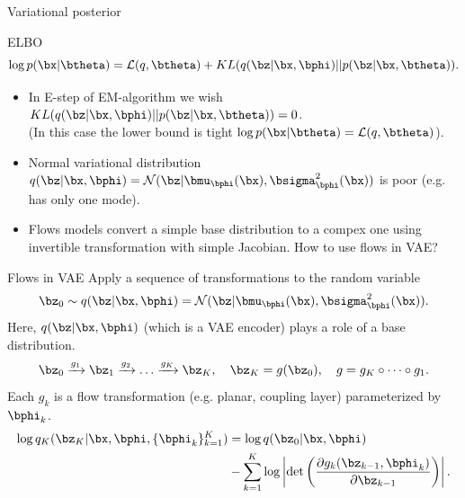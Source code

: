 \begin{frame}{Variational posterior}
	\begin{block}{ELBO}
	\[
		\log p(\bx | \btheta) = \mathcal{L}(q, \btheta) + KL(q(\bz | \bx, \bphi) || p(\bz | \bx, \btheta)).
	\]
	\end{block}
	\begin{itemize}
		\item In E-step of EM-algorithm we wish $KL(q(\bz | \bx, \bphi) || p(\bz | \bx, \btheta)) = 0$. \\
		(In this case the lower bound is tight $\log p(\bx | \btheta) = \mathcal{L}(q, \btheta)$). \\
		\item Normal variational distribution $q(\bz | \bx, \bphi) = \mathcal{N}(\bz| \bmu_{\bphi}(\bx), \bsigma^2_{\bphi}(\bx))$ is poor (e.g. has only one mode). \\
		\item Flows models convert a simple base distribution to a compex one using invertible transformation with simple Jacobian. How to use flows in VAE?
	\end{itemize}
\end{frame}
\begin{frame}{Flows in VAE}
	Apply a sequence of transformations to the random variable
	\[
	\bz_0 \sim q(\bz | \bx, \bphi) = \mathcal{N}(\bz| \bmu_{\bphi}(\bx), \bsigma^2_{\bphi}(\bx)).
	\]
	Here, $q(\bz | \bx, \bphi)$ (which is a VAE encoder) plays a role of a base distribution.
	\[
	\bz_0 \xrightarrow{g_1} \bz_1 \xrightarrow{g_2} \dots \xrightarrow{g_K} \bz_K, \quad \bz_K = g(\bz_0), \quad g = g_K \circ \dots \circ g_1.
	\]
	Each $g_k $ is a flow transformation (e.g. planar, coupling layer) parameterized by $\bphi_k$.
	\begin{align*}
		\log q_K(\bz_K | \bx, \bphi, \{\bphi_k\}_{k=1}^K) &= \log q(\bz_0 | \bx, \bphi) \\ &- \sum_{k=1}^K \log \left| \det \left( \frac{\partial g_k(\bz_{k - 1}, \bphi_k)}{\partial \bz_{k-1}} \right) \right|.
	\end{align*}

\end{frame}
